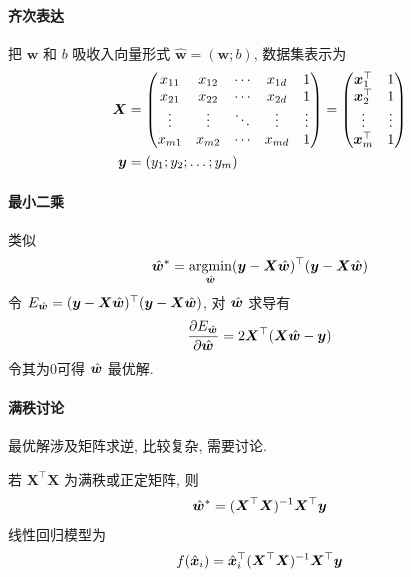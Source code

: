 \paragraph{齐次表达} 把 $\bm w$ 和 $b$ 吸收入向量形式 $\hat{\bm w}=(\bm w;b)$, 数据集表示为
\begin{align*}
    \bm{X}&=\begin{pmatrix}
        x_{11} & x_{12} & \cdots & x_{1d} & 1\\
        x_{21} & x_{22} & \cdots & x_{2d} & 1\\
        \vdots & \vdots & \ddots & \vdots & \vdots\\
        x_{m1} & x_{m2} & \cdots & x_{md} & 1\\
    \end{pmatrix}= \begin{pmatrix}
        \bm{x}_1^\top & 1\\
        \bm{x}_2^\top & 1\\
        \vdots & \vdots\\
        \bm{x}_m^\top & 1\\
    \end{pmatrix}\\
    \bm{y}&=(y_1;y_2;\dots;y_m)
\end{align*}

\paragraph{最小二乘}类似
\begin{align*}
    \hat{\bm{w}}^*=\operatorname*{argmin}_{\hat{\bm{w}}}(\bm{y} - \bm X \hat{\bm{w}})^\top(\bm{y} - \bm X \hat{\bm{w}})
\end{align*}
令 $E_{\hat{\bm{w}}}= (\bm{y} - \bm X \hat{\bm{w}})^\top(\bm{y} - \bm X \hat{\bm{w}})$, 对 $\hat{\bm{w}}$ 求导有
\begin{align*}
    \frac{\partial E_{\hat{\bm{w}}}}{\partial \hat{\bm{w}}}=2\bm{X}^\top(\bm{X}\hat{\bm{w}}-\bm{y})
\end{align*}
令其为0可得 $\hat{\bm{w}}$ 最优解. 

\paragraph{满秩讨论}最优解涉及矩阵求逆, 比较复杂, 需要讨论. 

若 $\bm{X}^\top\bm X$ 为满秩或正定矩阵, 则
\begin{align*}
    \hat{\bm{w}}^*=(\bm{X}^\top\bm X)^{-1}\bm{X}^\top \bm{y}
\end{align*}
线性回归模型为
\begin{align*}
    f(\hat{\bm{x}}_i)=\hat{\bm{x}}_i^\top(\bm{X}^\top\bm X)^{-1}\bm{X}^\top \bm{y}
\end{align*}

